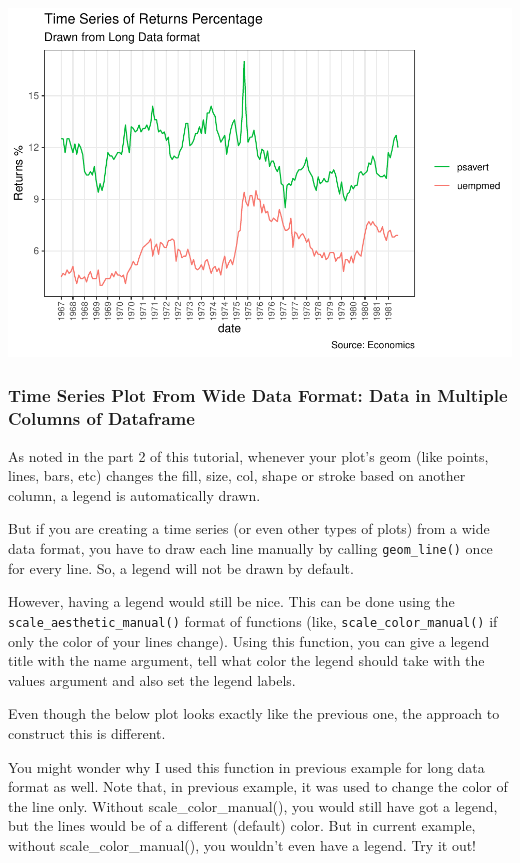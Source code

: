 \documentclass[a4paper]{article}
\begin{document}
\includegraphics{M24-ggplot2_Gallery_files/figure-latex/unnamed-chunk-45-1.pdf}
\newpage

\subsubsection{Time Series Plot From Wide Data Format: Data in Multiple
Columns of
Dataframe}\label{time-series-plot-from-wide-data-format-data-in-multiple-columns-of-dataframe}

As noted in the part 2 of this tutorial, whenever your plot's geom (like
points, lines, bars, etc) changes the fill, size, col, shape or stroke
based on another column, a legend is automatically drawn.

But if you are creating a time series (or even other types of plots)
from a wide data format, you have to draw each line manually by calling
\texttt{geom\_line()} once for every line. So, a legend will not be
drawn by default.

However, having a legend would still be nice. This can be done using the
\texttt{scale\_aesthetic\_manual()} format of functions (like,
\texttt{scale\_color\_manual()} if only the color of your lines change).
Using this function, you can give a legend title with the name argument,
tell what color the legend should take with the values argument and also
set the legend labels.

Even though the below plot looks exactly like the previous one, the
approach to construct this is different.

You might wonder why I used this function in previous example for long
data format as well. Note that, in previous example, it was used to
change the color of the line only. Without scale\_color\_manual(), you
would still have got a legend, but the lines would be of a different
(default) color. But in current example, without scale\_color\_manual(),
you wouldn't even have a legend. Try it out!
\end{document}
